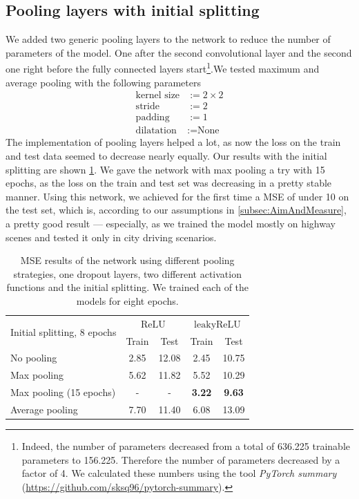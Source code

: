 \documentclass[conference]{IEEEtran}
\begin{document}
\subsection{Pooling layers with initial splitting}
We added two generic pooling layers to the network to reduce the number of parameters of the model. One after the second 
convolutional layer and the second one right before the fully connected layers start\footnote{Indeed, the number of 
parameters decreased from a total of 636.225 trainable parameters to 156.225. Therefore the number of parameters decreased by a 
factor of 4. We calculated these numbers using the tool \emph{PyTorch summary} (\url{https://github.com/sksq96/pytorch-summary}).}.We tested maximum and average pooling with the following 
parameters
\begin{align*}
\text{kernel size} &:= 2\times 2\\
\text{stride} &:= 2\\
\text{padding} &:= 1\\
\text{dilatation} &:= \text{None}
\end{align*}
The implementation of pooling layers helped a lot, as now the loss on the train and test data seemed to 
decrease nearly equally. Our results with the initial splitting are shown 
\cref{tab:ResultsInitialSplitting}. We gave the network
with max pooling a try with 15 epochs, as the loss on the train and test set was decreasing in a pretty 
stable manner. Using this network, we achieved for the first time a MSE of under 10 on the test set,
which is, according to our assumptions in \cref{subsec:AimAndMeasure}, a 
pretty good result --- especially, as we trained the model mostly on highway scenes and tested it only 
in city driving scenarios.
\begin{table}[!t]
\normalsize
\centering
\begin{tabular}{lcccc}
\toprule
\multirow{2}{*}{Initial splitting, 8 epochs}  & \multicolumn{2}{c}{$\mathrm{ReLU}$} & \multicolumn{2}{c}{$\mathrm{leakyReLU}$} \\
 & Train & Test & Train & Test\\
\midrule
No pooling & 2.85 & 12.08 & 2.45 & 10.75 \\
Max pooling & 5.62 & 11.82 & 5.52 & 10.29 \\
Max pooling (15 epochs) & - & - & \textbf{3.22} & \textbf{9.63} \\
Average pooling & 7.70 & 11.40 & 6.08 & 13.09\\
\bottomrule
\end{tabular}
\caption{MSE results of the network using different pooling strategies, one dropout layers, two different activation functions and 
the initial splitting. We trained each of the models for eight epochs.}
\label{tab:ResultsInitialSplitting}
\end{table}
\end{document}
